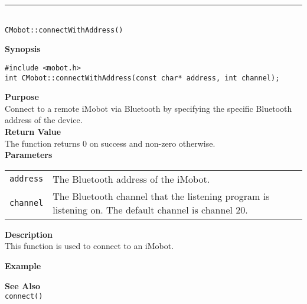 \noindent
\vspace{5pt}
\rule{4.5in}{0.015in} \\
\noindent
{\LARGE \texttt{CMobot::connectWithAddress()}}\\
{}

\noindent
{\bf Synopsis}\\
\begin{verbatim}
#include <mobot.h>
int CMobot::connectWithAddress(const char* address, int channel);
\end{verbatim}

\noindent
{\bf Purpose}\\
Connect to a remote iMobot via Bluetooth by specifying the specific Bluetooth
address of the device.\\

\noindent
{\bf Return Value}\\
The function returns 0 on success and non-zero otherwise.\\

\noindent
{\bf Parameters}
\vspace{-0.1in}
\begin{description}
\item               
\begin{tabular}{p{10 mm}p{145 mm}}
\texttt{address} & The Bluetooth address of the iMobot. \\
\texttt{channel} & The Bluetooth channel that the listening program is
listening on. The default channel is channel 20. \\
\end{tabular}
\end{description}

\noindent
{\bf Description}\\
This function is used to connect to an iMobot. 

\noindent
{\bf Example}\\
\noindent

\noindent
{\bf See Also}\\
\texttt{connect()}

